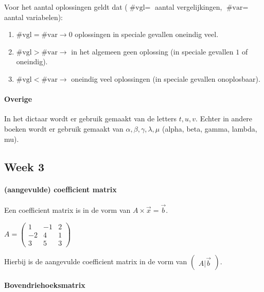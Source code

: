 \documentclass[11pt]{article}
\providecommand{\tightlist}{%
      \setlength{\itemsep}{0pt}\setlength{\parskip}{0pt}}
\begin{document}
Voor het aantal oplossingen geldt dat (\(\text{#vgl}=\) aantal
vergelijkingen, \(\text{#var}=\) aantal variabelen):

\begin{enumerate}
\def\labelenumi{\arabic{enumi}.}
\tightlist
\item
  \(\text{#vgl}=\text{#var} \rightarrow 0\) oplossingen in speciale
  gevallen oneindig veel.
\item
  \(\text{#vgl}>\text{#var} \rightarrow\) in het algemeen geen oplossing
  (in speciale gevallen \(1\) of oneindig).
\item
  \(\text{#vgl}<\text{#var} \rightarrow\) oneindig veel oplossingen (in
  speciale gevallen onoplosbaar).
\end{enumerate}

    \hypertarget{overige}{%
\paragraph{Overige}\label{overige}}

    In het dictaar wordt er gebruik gemaakt van de letters \(t,u,v\). Echter
in andere boeken wordt er gebruik gemaakt van
\(\alpha, \beta, \gamma, \lambda, \mu\) (alpha, beta, gamma, lambda,
mu).

    \hypertarget{week-3}{%
\subsection{Week 3}\label{week-3}}

    \hypertarget{aangevulde-coefficient-matrix}{%
\paragraph{(aangevulde) coefficient
matrix}\label{aangevulde-coefficient-matrix}}

    Een coefficient matrix is in de vorm van \(A \times \vec{x} = \vec{b}\).

\(A=\begin{pmatrix}1 & -1 & 2 \\ -2 & 4 & 1 \\ 3 & 5 & 3\end{pmatrix}\)

Hierbij is de aangevulde coefficient matrix in de vorm van
\(\begin{pmatrix}A|\vec{b}\end{pmatrix}\).

    \hypertarget{bovendriehoeksmatrix}{%
\paragraph{Bovendriehoeksmatrix}\label{bovendriehoeksmatrix}}
\end{document}
